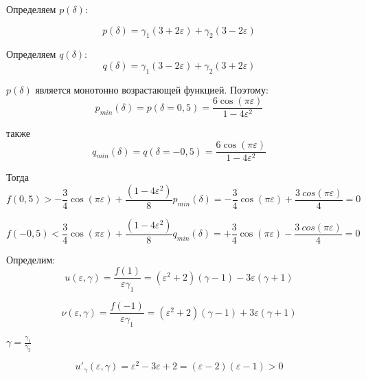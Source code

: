 Определяем $p(\delta)$:

\begin{equation}
	\label{eq:equation42}
	p(\delta) = \gamma_1 (3+2\varepsilon) + \gamma_2 (3-2\varepsilon)
\end{equation}

Определяем $q(\delta)$:
\begin{equation}
	\label{eq:equation43}
	q(\delta) = \gamma_1 (3-2\varepsilon) + \gamma_2 (3+2\varepsilon)
\end{equation}

$p(\delta)$ является монотонно возрастающей функцией. Поэтому:
\begin{equation}
	\label{eq:equation44}
	p_{min}(\delta) = p(\delta = 0,5) = \frac{6 \cos(\pi  \varepsilon)}{1-4\varepsilon ^2}
\end{equation}

также
\begin{equation}
	\label{eq:equation45}
	q_{min}(\delta) = q(\delta = -0,5) = \frac{6 \cos(\pi  \varepsilon)}{1-4\varepsilon ^2}
\end{equation}

Тогда
\begin{equation}
	\label{eq:equation46}
	f(0,5) > -\frac{3}{4} \cos (\pi \varepsilon) + \frac{(1-4 \varepsilon ^2)}{8} p_{min} (\delta) = - \frac{3}{4} \cos(\pi \varepsilon) + \frac{3 \ cos(\pi \varepsilon)}{4} = 0 
\end{equation}

\begin{equation}
	\label{eq:equation47}
	f(-0,5) < \frac{3}{4} \cos (\pi \varepsilon) + \frac{(1-4 \varepsilon ^2)}{8} q_{min} (\delta) = + \frac{3}{4} \cos(\pi \varepsilon) - \frac{3 \ cos(\pi \varepsilon)}{4} = 0 
\end{equation}

Определим:
\begin{equation}
	\label{eq:equation48}
	u(\varepsilon, \gamma) = \frac{f(1)}{\varepsilon \gamma_1} = (\varepsilon ^2 + 2) (\gamma - 1) - 3\varepsilon (\gamma + 1)
\end{equation}

\begin{equation}
	\label{eq:equation49}
	\nu(\varepsilon, \gamma) = \frac{f(-1)}{\varepsilon \gamma_1} = (\varepsilon ^2 + 2) (\gamma - 1) + 3\varepsilon (\gamma + 1)
\end{equation}

$\gamma = \frac{\gamma_1}{\gamma_2}$

\begin{equation}
	\label{eq:equation50}
	u'_{\gamma}(\varepsilon, \gamma) = \varepsilon^2 - 3\varepsilon + 2 = (\varepsilon - 2)(\varepsilon -1) >0
\end{equation}

